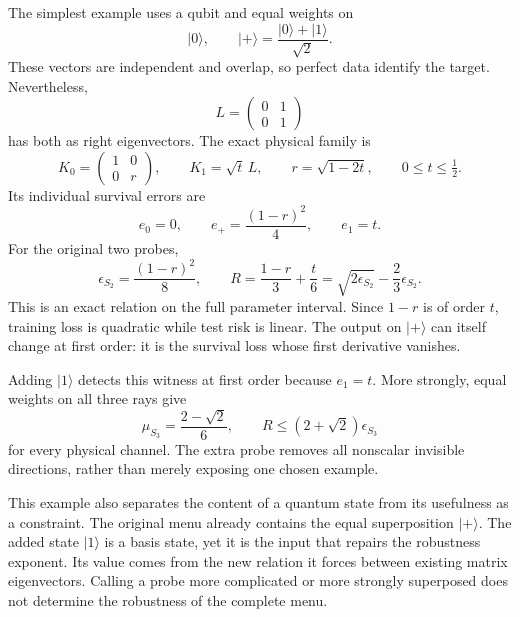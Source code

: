\documentclass[11pt,a4paper]{article}
\newcommand{\ket}[1]{\lvert #1\rangle}
\numberwithin{equation}{section}
\begin{document}
The simplest example uses a qubit and equal weights on
\[
\ket{0},\qquad \ket{+}=\frac{\ket{0}+\ket{1}}{\sqrt2}.
\]
These vectors are independent and overlap, so perfect data identify the target. Nevertheless,
\[
L=\begin{pmatrix}0&1\\0&1\end{pmatrix}
\]
has both as right eigenvectors. The exact physical family is
\[
K_0=\begin{pmatrix}1&0\\0&r\end{pmatrix},\qquad
K_1=\sqrt t\,L,\qquad
r=\sqrt{1-2t},\qquad 0\leq t\leq\tfrac12.
\]
Its individual survival errors are
\[
e_0=0,\qquad e_+=\frac{(1-r)^2}{4},\qquad e_1=t.
\]
For the original two probes,
\[
\epsilon_{S_2}=\frac{(1-r)^2}{8},\qquad
R=\frac{1-r}{3}+\frac t6
 =\sqrt{2\epsilon_{S_2}}-\frac23\epsilon_{S_2}.
\]
This is an exact relation on the full parameter interval. Since $1-r$ is of order $t$, training loss is quadratic while test risk is linear. The output on $\ket{+}$ can itself change at first order: it is the survival loss whose first derivative vanishes.

Adding $\ket{1}$ detects this witness at first order because $e_1=t$. More strongly, equal weights on all three rays give
\[
\mu_{S_3}=\frac{2-\sqrt2}{6},\qquad
R\leq(2+\sqrt2)\epsilon_{S_3}
\]
for every physical channel. The extra probe removes all nonscalar invisible directions, rather than merely exposing one chosen example.

This example also separates the content of a quantum state from its usefulness as a constraint. The original menu already contains the equal superposition $\ket{+}$. The added state $\ket{1}$ is a basis state, yet it is the input that repairs the robustness exponent. Its value comes from the new relation it forces between existing matrix eigenvectors. Calling a probe more complicated or more strongly superposed does not determine the robustness of the complete menu.
\end{document}
